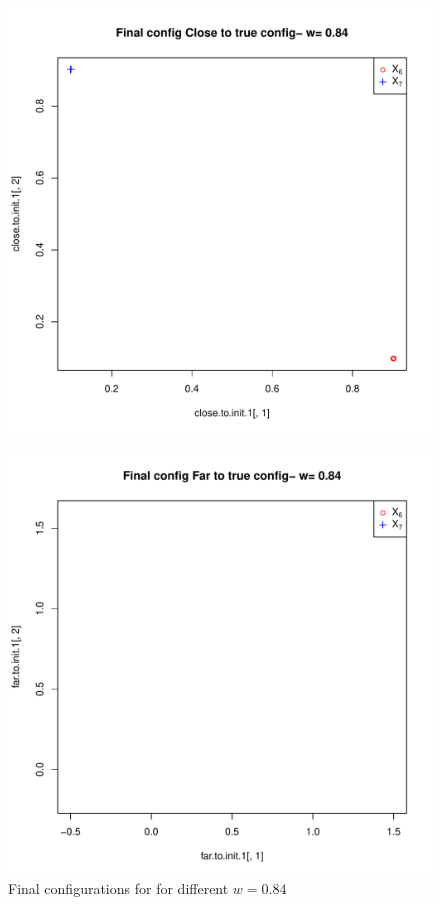 \documentclass[12pt,oneside,final]{thesis}
\begin{document}
\begin{figure}
\begin{minipage}[b]{0.5\linewidth}
\centering
\includegraphics[scale=0.45]{true-min-w0_84.pdf}

\label{fig:figure2-1}
\end{minipage}
\hspace{0.5cm}
\begin{minipage}[b]{0.5\linewidth}
\centering
\includegraphics[scale=0.45]{other-min-w0_84.pdf}


\end{minipage}

\caption{Final configurations for for different $w=0.84$ }
\label{fig:Finalconfig-MultMin-w-0_84}

\end{figure}
\end{document}
